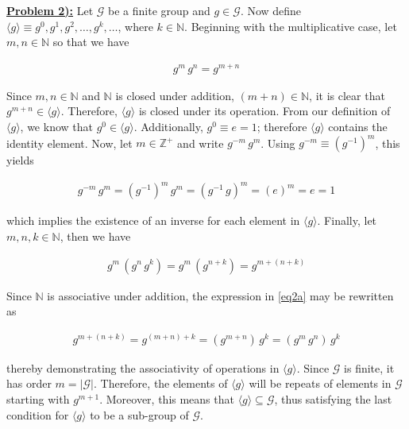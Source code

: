 \documentclass{article}[12]
\numberwithin{equation}{section}
\newcommand{\numbpr}[1]{\setcounter{section}{#1} \setcounter{equation}{0}}
\newcommand{\prob}[1]{\textbf{\underline{Problem #1):}}}
\newcommand{\N}{\mathbb{N}}
\newcommand{\Z}{\mathbb{Z}}
\begin{document}
\begin{flushleft}
\vspace{0.25 in}



\numbpr{2}
\prob{2} Let $\mathcal{G}$ be a finite group and $g \in \mathcal{G}$.  Now define $\langle g \rangle \equiv g^0, g^1, g^2, \dots, g^k, \dots$, where $k \in \N$.  Beginning with the multiplicative case, let $m, n \in \N$ so that we have

\begin{align*}
  g^m \, g^n = g^{m + n}
\end{align*}

Since $m, n \in \N$ and $\N$ is closed under addition, $\left( m + n \right) \in \N$, it is clear that $g^{m + n} \in \langle g \rangle$.  Therefore, $\langle g \rangle$ is closed under its operation.  From our definition of $\langle g \rangle$, we know that $g^0 \in \langle g \rangle$.  Additionally, $g^0 \equiv e = 1$; therefore $\langle g \rangle$ contains the identity element.  Now, let $m \in \Z^+$ and write $g^{-m} \, g^m$.  Using $g^{-m} \equiv \left( g^{-1} \right)^m$, this yields

\begin{align*}
  g^{-m} \, g^m = \left( g^{-1} \right)^m \, g^m = \left( g^{-1} \, g \right)^m = \left( e \right)^m = e = 1
\end{align*}

which implies the existence of an inverse for each element in $\langle g \rangle$.  Finally, let $m, n, k \in \N$, then we have

\begin{align}
  g^m \, \left( g^n \, g^k \right) = g^m \, \left( g^{n + k} \right) = g^{m + \left( n + k \right)} \label{eq2a}
\end{align}

Since $\N$ is associative under addition, the expression in \ref{eq2a} may be rewritten as

\begin{align*}
  g^{m + \left( n + k \right)} = g^{\left( m + n \right) + k} = \left( g^{m + n} \right) \, g^k = \left( g^m \, g^n \right) \, g^k
\end{align*}

thereby demonstrating the associativity of operations in $\langle g \rangle$.  Since $\mathcal{G}$ is finite, it has order $m = \lvert \mathcal{G} \rvert$.  Therefore, the elements of $\langle g \rangle$ will be repeats of elements in $\mathcal{G}$ starting with $g^{m + 1}$.  Moreover, this means that $\langle g \rangle \subseteq \mathcal{G}$, thus satisfying the last condition for $\langle g \rangle$ to be a sub-group of $\mathcal{G}$. \newline


\end{flushleft}
\end{document}
